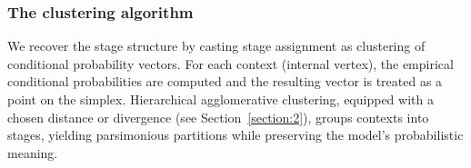 \documentclass[preprint,12pt]{elsarticle}
\newcommand{\blue}{\color{blue}}
\begin{document}
\subsubsection{The clustering algorithm}

We recover the stage structure by casting stage assignment as clustering of conditional probability vectors. For each context (internal vertex), the empirical conditional probabilities are computed and the resulting vector is treated as a point on the simplex. Hierarchical agglomerative clustering, equipped with a chosen distance or divergence (see Section~\ref{section:2}), groups contexts into stages, yielding parsimonious partitions while preserving the model’s probabilistic meaning.







\end{document}
